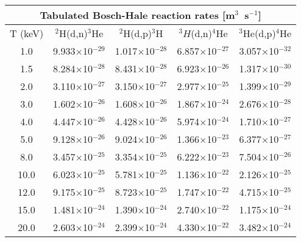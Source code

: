 \begin{table}[h!]\small
  \noindent
  \centering
  \begin{tabular}{c | c c | c | c}
    \multicolumn{5}{c}{Tabulated Bosch-Hale reaction rates [m$^3$~s$^{-1}$]}\\
    \hline
    T (keV) & $^2$H(d,n)$^3$He & $^2$H(d,p)$^3$H & $^3H$(d,n)$^4$He & $^3$He(d,p)$^4$He\\
    \hline\hline
    1.0& 9.933$\times$10$^{-29}$ & 1.017$\times$10$^{-28}$ & 6.857$\times$10$^{-27}$ & 3.057$\times$10$^{-32}$ \\
    1.5  & 8.284$\times$10$^{-28}$ & 8.431$\times$10$^{-28}$ & 6.923$\times$10$^{-26}$ & 1.317$\times$10$^{-30}$ \\
    2.0  & 3.110$\times$10$^{-27}$ & 3.150$\times$10$^{-27}$ & 2.977$\times$10$^{-25}$ & 1.399$\times$10$^{-29}$ \\
    3.0  & 1.602$\times$10$^{-26}$ & 1.608$\times$10$^{-26}$ & 1.867$\times$10$^{-24}$ & 2.676$\times$10$^{-28}$ \\
    4.0  & 4.447$\times$10$^{-26}$ & 4.428$\times$10$^{-26}$ & 5.974$\times$10$^{-24}$ & 1.710$\times$10$^{-27}$ \\
    5.0  & 9.128$\times$10$^{-26}$ & 9.024$\times$10$^{-26}$ & 1.366$\times$10$^{-23}$ & 6.377$\times$10$^{-27}$ \\
    8.0  & 3.457$\times$10$^{-25}$ & 3.354$\times$10$^{-25}$ & 6.222$\times$10$^{-23}$ & 7.504$\times$10$^{-26}$ \\
   10.0  & 6.023$\times$10$^{-25}$ & 5.781$\times$10$^{-25}$ & 1.136$\times$10$^{-22}$ & 2.126$\times$10$^{-25}$ \\
   12.0  & 9.175$\times$10$^{-25}$ & 8.723$\times$10$^{-25}$ & 1.747$\times$10$^{-22}$ & 4.715$\times$10$^{-25}$ \\
   15.0  & 1.481$\times$10$^{-24}$ & 1.390$\times$10$^{-24}$ & 2.740$\times$10$^{-22}$ & 1.175$\times$10$^{-24}$ \\
   20.0& 2.603$\times$10$^{-24}$ & 2.399$\times$10$^{-24}$ & 4.330$\times$10$^{-22}$ & 3.482$\times$10$^{-24}$ \\
   \hline
  \end{tabular}
  \label{table:rr}
\end{table}

